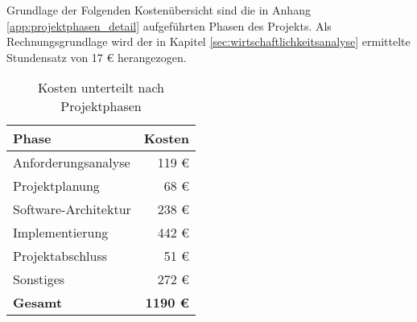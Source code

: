 \label{app:kosten}

Grundlage der Folgenden Kostenübersicht sind die in Anhang \ref{app:projektphasen_detail} aufgeführten Phasen des Projekts.
Als Rechnungsgrundlage wird der in Kapitel \ref{sec:wirtschaftlichkeitsanalyse} ermittelte Stundensatz von 17 \euro{} herangezogen.

\begin{table}[H]
	\centering
	\begin{tabular}{lr}

		\rowcolor{white!15}				
		\textbf{Phase} & \textbf{Kosten}  \\\hline		
		
		
		Anforderungsanalyse		& 119 \euro \\
		Projektplanung			& 68 \euro \\
		Software-Architektur	& 238 \euro \\
		Implementierung			& 442 \euro \\
		Projektabschluss		& 51 \euro \\
		Sonstiges				& 272 \euro \\\hline
		\textbf{Gesamt}			& \textbf{1190 \euro}
		
			    
	\end{tabular}
	
	\caption{Kosten unterteilt nach Projektphasen}
	\label{tab:kosten_detail}
\end{table}		